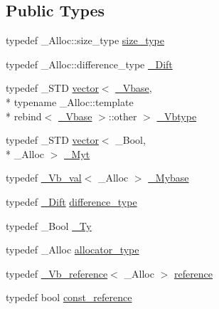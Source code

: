 \subsection*{Public Types}
\begin{DoxyCompactItemize}
\item 
typedef \+\_\+\+Alloc\+::size\+\_\+type \hyperlink{classvector_3_01___bool_00_01___alloc_01_4_af9cea187d823373a41b15fea30455e7a}{size\+\_\+type}
\item 
typedef \+\_\+\+Alloc\+::difference\+\_\+type \hyperlink{classvector_3_01___bool_00_01___alloc_01_4_ab724ede91c7a24f8e27c0dca79f10742}{\+\_\+\+Dift}
\item 
typedef \+\_\+\+S\+T\+D \hyperlink{classvector}{vector}$<$ \hyperlink{vector_8h_a1555a2f621ba9ade75bb9ce8bca77144}{\+\_\+\+Vbase}, \\*
typename \+\_\+\+Alloc\+::template \\*
rebind$<$ \hyperlink{vector_8h_a1555a2f621ba9ade75bb9ce8bca77144}{\+\_\+\+Vbase} $>$\+::other $>$ \hyperlink{classvector_3_01___bool_00_01___alloc_01_4_a75194d2d323a8ab90a486691176345f5}{\+\_\+\+Vbtype}
\item 
typedef \+\_\+\+S\+T\+D \hyperlink{classvector}{vector}$<$ \+\_\+\+Bool, \\*
\+\_\+\+Alloc $>$ \hyperlink{classvector_3_01___bool_00_01___alloc_01_4_ada353b682f03c458260a7f7cf361d465}{\+\_\+\+Myt}
\item 
typedef \hyperlink{class___vb__val}{\+\_\+\+Vb\+\_\+val}$<$ \+\_\+\+Alloc $>$ \hyperlink{classvector_3_01___bool_00_01___alloc_01_4_a90abb38ec959ec3cdec7a70765171609}{\+\_\+\+Mybase}
\item 
typedef \hyperlink{classvector_3_01___bool_00_01___alloc_01_4_ab724ede91c7a24f8e27c0dca79f10742}{\+\_\+\+Dift} \hyperlink{classvector_3_01___bool_00_01___alloc_01_4_ada17d1119c13b3e998d89dcec059b2ce}{difference\+\_\+type}
\item 
typedef \+\_\+\+Bool \hyperlink{classvector_3_01___bool_00_01___alloc_01_4_aa52755d5f25533b3a4db77fa17b528a7}{\+\_\+\+Ty}
\item 
typedef \+\_\+\+Alloc \hyperlink{classvector_3_01___bool_00_01___alloc_01_4_a5d383a2381a0b1643f8c2b9618286c95}{allocator\+\_\+type}
\item 
typedef \hyperlink{class___vb__reference}{\+\_\+\+Vb\+\_\+reference}$<$ \+\_\+\+Alloc $>$ \hyperlink{classvector_3_01___bool_00_01___alloc_01_4_afa1a38ae57c26454f265b34ebc302830}{reference}
\item 
typedef bool \hyperlink{classvector_3_01___bool_00_01___alloc_01_4_ab8b5b0a3cc432065c3a9083e11014298}{const\+\_\+reference}

\end{DoxyCompactItemize}
